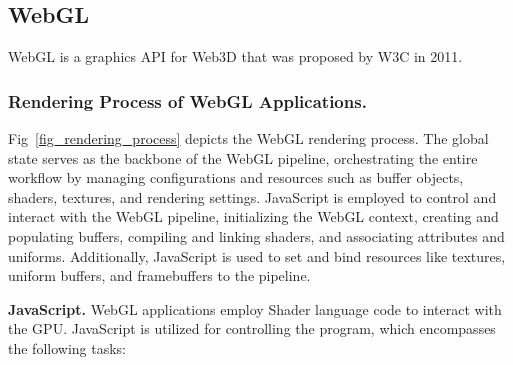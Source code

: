 


\subsection{WebGL}

WebGL is a graphics API for Web3D that was proposed by W3C in 2011. 

\subsubsection{Rendering Process of WebGL Applications.}


Fig\ \ref{fig_rendering_process} depicts the WebGL rendering process.
The global state serves as the backbone of the WebGL pipeline, orchestrating the entire workflow by managing configurations and resources such as buffer objects, shaders, textures, and rendering settings. JavaScript is employed to control and interact with the WebGL pipeline, initializing the WebGL context, creating and populating buffers, compiling and linking shaders, and associating attributes and uniforms. Additionally, JavaScript is used to set and bind resources like textures, uniform buffers, and framebuffers to the pipeline.

\textbf{JavaScript.} WebGL applications employ Shader language code to interact with the GPU\@. JavaScript is utilized for controlling the program, which encompasses the following tasks:

